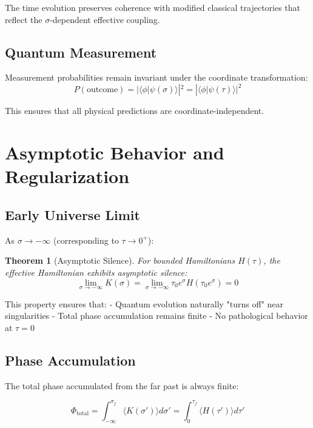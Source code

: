 \documentclass[11pt,a4paper]{article}
\newtheorem{theorem}{Theorem}[section]
\begin{document}
The time evolution preserves coherence with modified classical trajectories that reflect the $\sigma$-dependent effective coupling.

\subsection{Quantum Measurement}

Measurement probabilities remain invariant under the coordinate transformation:
\begin{equation}
P(\text{outcome}) = |\langle \phi | \psi(\sigma) \rangle|^2 = |\langle \phi | \psi(\tau) \rangle|^2
\end{equation}

This ensures that all physical predictions are coordinate-independent.

\section{Asymptotic Behavior and Regularization}

\subsection{Early Universe Limit}

As $\sigma \to -\infty$ (corresponding to $\tau \to 0^+$):

\begin{theorem}[Asymptotic Silence]
For bounded Hamiltonians $H(\tau)$, the effective Hamiltonian exhibits asymptotic silence:
\begin{equation}
\lim_{\sigma \to -\infty} K(\sigma) = \lim_{\sigma \to -\infty} \tau_0 e^{\sigma} H(\tau_0 e^{\sigma}) = 0
\end{equation}
\end{theorem}

This property ensures that:
- Quantum evolution naturally "turns off" near singularities
- Total phase accumulation remains finite
- No pathological behavior at $\tau = 0$

\subsection{Phase Accumulation}

The total phase accumulated from the far past is always finite:

\begin{equation}
\Phi_{\text{total}} = \int_{-\infty}^{\sigma_f} \langle K(\sigma') \rangle d\sigma' = \int_0^{\tau_f} \langle H(\tau') \rangle d\tau'
\end{equation}
\end{document}
